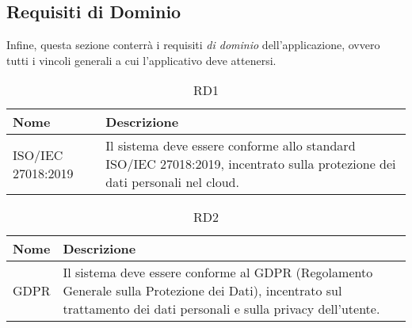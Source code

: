 \documentclass{natourDoc}
\begin{document}
	\subsection{Requisiti di Dominio}
	Infine, questa sezione conterrà i requisiti \textit{di dominio} dell'applicazione, ovvero tutti i vincoli generali a cui l'applicativo
	deve attenersi. \\

	\begin{table}[H]
		\centering
		\begin{tabular}{ |p{5cm}|p{10.3cm}| }
			\hline
			\rowcolor{PineGreen!70}
			\textbf{Nome} & \textbf{Descrizione} \\
			\hline
			ISO/IEC 27018:2019 & Il sistema deve essere conforme allo standard ISO/IEC 27018:2019, 
			incentrato sulla protezione dei dati personali nel cloud. \\
			\hline
		\end{tabular}
		\caption{RD1}
		\label{table:26}
	\end{table}

	\begin{table}[H]
		\centering
		\begin{tabular}{ |p{5cm}|p{10.3cm}| }
			\hline
			\rowcolor{PineGreen!70}
			\textbf{Nome} & \textbf{Descrizione} \\
			\hline
			GDPR & Il sistema deve essere conforme al GDPR (Regolamento Generale sulla Protezione dei Dati), 
			incentrato sul trattamento dei dati personali e sulla privacy dell’utente.  \\
			\hline
		\end{tabular}
		\caption{RD2}
		\label{table:27}
	\end{table}
\end{document}
